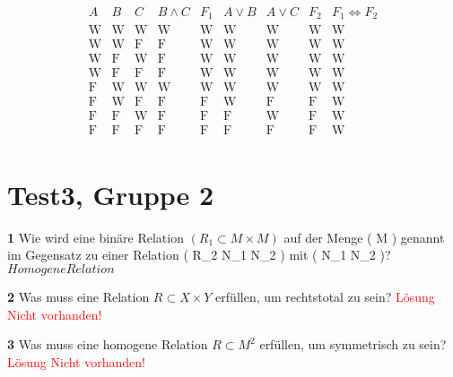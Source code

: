 \documentclass[11pt]{article}
\begin{document}
\[
    \begin{array}{ccc|c|c|c|c|c|c|c}
        A & B & C & B \land C & F_1 & A \lor B & A \lor C & F_2 & F_1 \Leftrightarrow F_2 \\
        \hline
        \text{W} & \text{W} & \text{W} & \text{W} & \text{W} & \text{W} & \text{W} & \text{W} & \text{W} \\
        \text{W} & \text{W} & \text{F} & \text{F} & \text{W} & \text{W} & \text{W} & \text{W} & \text{W} \\
        \text{W} & \text{F} & \text{W} & \text{F} & \text{W} & \text{W} & \text{W} & \text{W} & \text{W} \\
        \text{W} & \text{F} & \text{F} & \text{F} & \text{W} & \text{W} & \text{W} & \text{W} & \text{W} \\
        \text{F} & \text{W} & \text{W} & \text{W} & \text{W} & \text{W} & \text{W} & \text{W} & \text{W} \\
        \text{F} & \text{W} & \text{F} & \text{F} & \text{F} & \text{W} & \text{F} & \text{F} & \text{W} \\
        \text{F} & \text{F} & \text{W} & \text{F} & \text{F} & \text{F} & \text{W} & \text{F} & \text{W} \\
        \text{F} & \text{F} & \text{F} & \text{F} & \text{F} & \text{F} & \text{F} & \text{F} & \text{W} \\
    \end{array}
\]

\section{Test3, Gruppe 2}
    \textbf{1} Wie wird eine binäre Relation $( R_1 \subset M \times M )$ auf der Menge ( M ) genannt im Gegensatz zu einer Relation ( R_2 \subset N_1 \times N_2 ) mit ( N_1 \neq N_2 )?\newline
    $Homogene Relation$\newline

    \textbf{2} Was muss eine Relation \( R \subset X \times Y \) erfüllen, um rechtstotal zu sein?\newline
    \textcolor{red}{Lösung Nicht vorhanden!}\newline

    \textbf{3} Was muss eine homogene Relation \( R \subset M^2 \) erfüllen, um symmetrisch zu sein?\newline
    \textcolor{red}{Lösung Nicht vorhanden!}\newline
\end{document}
